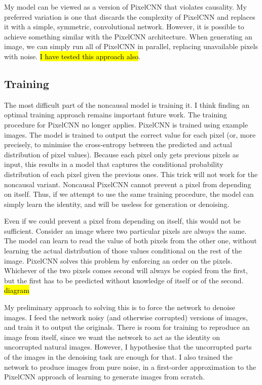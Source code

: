 \documentclass[10pt,a4paper]{article}
\begin{document}
My model can be viewed as a version of PixelCNN that violates causality. My preferred variation is one that discards the complexity of PixelCNN and replaces it with a simple, symmetric, convolutional network. However, it is possible to achieve something similar with the PixelCNN architecture. When generating an image, we can simply run all of PixelCNN in parallel, replacing unavailable pixels with noise. \hl{I have tested this approach also}.

\subsection{Training}

The most difficult part of the noncausal model is training it. I think finding an optimal training approach remains important future work. The training procedure for PixelCNN no longer applies. PixelCNN is trained using example images. The model is trained to output the correct value for each pixel (or, more precisely, to minimise the cross-entropy between the predicted and actual distribution of pixel values). Because each pixel only gets previous pixels as input, this results in a model that captures the conditional probability distribution of each pixel given the previous ones. This trick will not work for the noncausal variant. Noncausal PixelCNN cannot prevent a pixel from depending on itself. Thus, if we attempt to use the same training procedure, the model can simply learn the identity, and will be useless for generation or denoising.

Even if we could prevent a pixel from depending on itself, this would not be sufficient. Consider an image where two particular pixels are always the same. The model can learn to read the value of both pixels from the other one, without learning the actual distribution of those values conditional on the rest of the image. PixelCNN solves this problem by enforcing an order on the pixels. Whichever of the two pixels comes second will always be copied from the first, but the first has to be predicted without knowledge of itself or of the second. \hl{diagram}

My preliminary approach to solving this is to force the network to denoise images. I feed the network noisy (and otherwise corrupted) versions of images, and train it to output the originals. There is room for training to reproduce an image from itself, since we want the network to act as the identity on uncorrupted natural images. However, I hypothesise that the uncorrupted parts of the images in the denoising task are enough for that. I also trained the network to produce images from pure noise, in a first-order approximation to the PixelCNN approach of learning to generate images from scratch.
\end{document}
